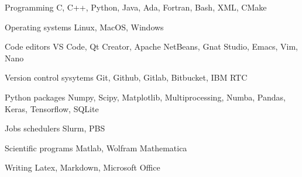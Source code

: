 

\begin{cvskills}

    \cvskill
    {Programming} %
    {C, C++, Python, Java, Ada, Fortran, Bash, XML, CMake} %

    \cvskill
    {Operating systems} %
    {Linux, MacOS, Windows} %

    \cvskill
    {Code editors} %
    {VS Code, Qt Creator, Apache NetBeans, Gnat Studio, Emacs, Vim, Nano} %

    \cvskill
    {Version control sysytems} %
    {Git, Github, Gitlab, Bitbucket, IBM RTC} %

    
    \cvskill
    {Python packages} %
    {Numpy, Scipy, Matplotlib, Multiprocessing, Numba, Pandas, Keras, Tensorflow, SQLite}

    \cvskill
    {Jobs schedulers} %
    {Slurm, PBS}
    
    \cvskill
    {Scientific programs} %
    {Matlab, Wolfram Mathematica} %

    \cvskill
    {Writing} %
    {Latex, Markdown, Microsoft Office} %

\end{cvskills}
